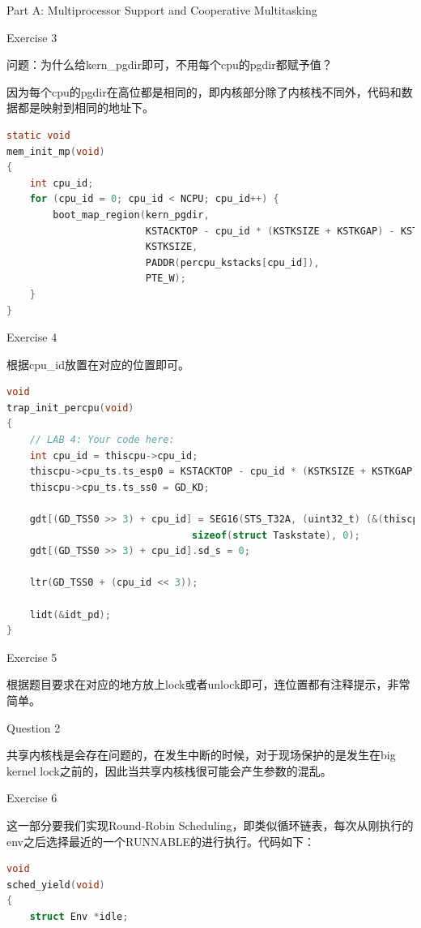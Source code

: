 \documentclass[GBK,winfonts,a4paper,10pt]{ctexart}
\begin{document}
\begin{section}{Part A: Multiprocessor Support and Cooperative Multitasking}
\begin{subsection}{Exercise 3}
\par
问题：为什么给kern\_pgdir即可，不用每个cpu的pgdir都赋予值？
\par
因为每个cpu的pgdir在高位都是相同的，即内核部分除了内核栈不同外，代码和数据都是映射到相同的地址下。
\begin{lstlisting}[language=C]
static void
mem_init_mp(void)
{    
    int cpu_id;
    for (cpu_id = 0; cpu_id < NCPU; cpu_id++) {
        boot_map_region(kern_pgdir,
                        KSTACKTOP - cpu_id * (KSTKSIZE + KSTKGAP) - KSTKSIZE,
                        KSTKSIZE,
                        PADDR(percpu_kstacks[cpu_id]),
                        PTE_W);
    }
}
\end{lstlisting}
\end{subsection}

\begin{subsection}{Exercise 4}
\par
根据cpu\_id放置在对应的位置即可。
\begin{lstlisting}[language=C]
void
trap_init_percpu(void)
{
	// LAB 4: Your code here:
    int cpu_id = thiscpu->cpu_id;
    thiscpu->cpu_ts.ts_esp0 = KSTACKTOP - cpu_id * (KSTKSIZE + KSTKGAP);
    thiscpu->cpu_ts.ts_ss0 = GD_KD;

    gdt[(GD_TSS0 >> 3) + cpu_id] = SEG16(STS_T32A, (uint32_t) (&(thiscpu->cpu_ts)),
    							sizeof(struct Taskstate), 0);
    gdt[(GD_TSS0 >> 3) + cpu_id].sd_s = 0;

    ltr(GD_TSS0 + (cpu_id << 3));

    lidt(&idt_pd);
}
\end{lstlisting}
\end{subsection}

\begin{subsection}{Exercise 5}
\par
根据题目要求在对应的地方放上lock或者unlock即可，连位置都有注释提示，非常简单。
\end{subsection}

\begin{subsection}{Question 2}
\par
共享内核栈是会存在问题的，在发生中断的时候，对于现场保护的是发生在big kernel lock之前的，因此当共享内核栈很可能会产生参数的混乱。
\end{subsection}

\begin{subsection}{Exercise 6}
\par
这一部分要我们实现Round-Robin Scheduling，即类似循环链表，每次从刚执行的env之后选择最近的一个RUNNABLE的进行执行。代码如下：
\begin{lstlisting}[language=C]
void
sched_yield(void)
{
	struct Env *idle;


\end{lstlisting}
\end{subsection}
\end{section}
\end{document}
